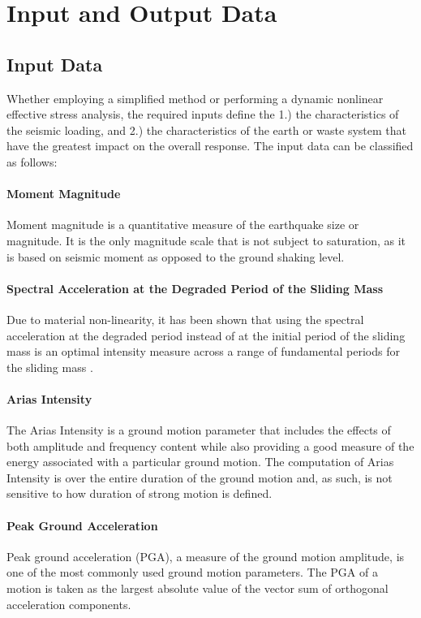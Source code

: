 \section{Input and Output Data}
\label{sec:eq_landslide_input_output}

\subsection{Input Data}
\label{subsec:eq_landslide_input}
Whether employing a simplified method or performing a dynamic nonlinear effective stress analysis, the required inputs define the 1.) the characteristics of the seismic loading, and 2.) the characteristics of the earth or waste system that have the greatest impact on the overall response. The input data can be classified as follows:\\[0.5em]

\paragraph{Moment Magnitude}
Moment magnitude is a quantitative measure of the earthquake size or magnitude. It is the only magnitude scale that is
not subject to saturation, as it is based on seismic moment as opposed to the ground shaking level.\\

\paragraph{Spectral Acceleration at the Degraded Period of the Sliding Mass}
Due to material non-linearity, it has been shown that using the spectral acceleration at the degraded period instead of at the initial period of the sliding mass is an optimal intensity measure across a range of fundamental periods for the sliding mass \citep{bray2007simplified}.

\paragraph{Arias Intensity}
The Arias Intensity is a ground motion parameter that includes the effects of both amplitude and frequency content while also providing a good measure of the energy associated with a particular ground motion. The computation of Arias Intensity is over the entire duration of the ground motion and, as such, is not sensitive to how duration of strong motion is defined.

\paragraph{Peak Ground Acceleration}
Peak ground acceleration (PGA), a measure of the ground motion amplitude, is one of the most commonly used ground motion parameters. The PGA of a motion is taken as the largest absolute value of the vector sum of orthogonal acceleration components.

